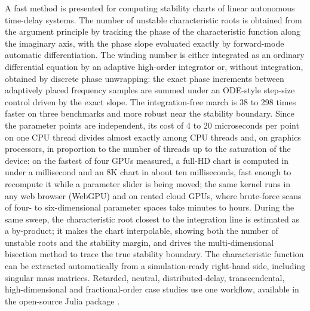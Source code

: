 A fast method is presented for computing stability charts of linear autonomous time-delay systems. The number of unstable characteristic roots is obtained from the argument principle by tracking the phase of the characteristic function along the imaginary axis, with the phase slope evaluated exactly by forward-mode automatic differentiation. The winding number is either integrated as an ordinary differential equation by an adaptive high-order integrator or, without integration, obtained by discrete phase unwrapping: the exact phase increments between adaptively placed frequency samples are summed under an ODE-style step-size control driven by the exact slope. The integration-free march is 38 to 298 times faster on three benchmarks and more robust near the stability boundary. Since the parameter points are independent, its cost of 4 to 20 microseconds per point on one CPU thread divides almost exactly among CPU threads and, on graphics processors, in proportion to the number of threads up to the saturation of the device: on the fastest of four GPUs measured, a full-HD chart is computed in under a millisecond and an 8K chart in about ten milliseconds, fast enough to recompute it while a parameter slider is being moved; the same kernel runs in any web browser (WebGPU) and on rented cloud GPUs, where brute-force scans of four- to six-dimensional parameter spaces take minutes to hours. During the same sweep, the characteristic root closest to the integration line is estimated as a by-product; it makes the chart interpolable, showing both the number of unstable roots and the stability margin, and drives the multi-dimensional bisection method to trace the true stability boundary. The characteristic function can be extracted automatically from a simulation-ready right-hand side, including singular mass matrices. Retarded, neutral, distributed-delay, transcendental, high-dimensional and fractional-order case studies use one workflow, available in the open-source Julia package .
